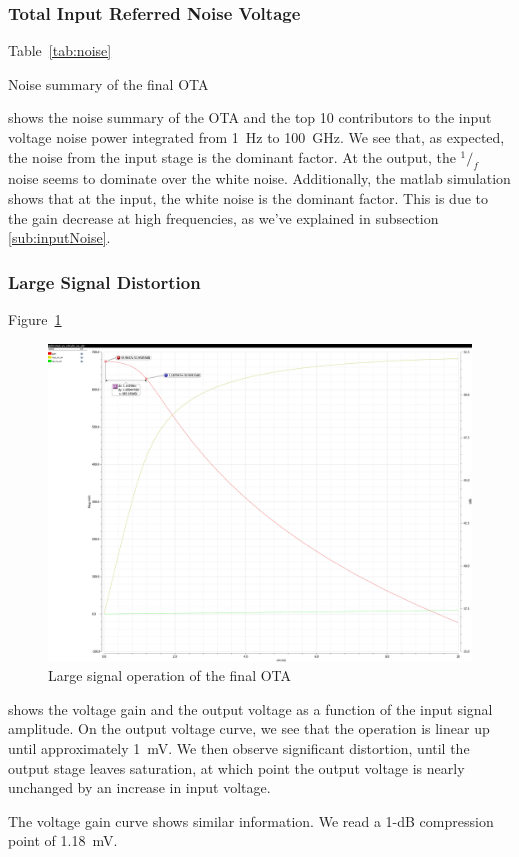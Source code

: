 \documentclass[english,10pt]{article}
\begin{document}
\subsubsection{Total Input Referred Noise Voltage}
Table~\ref{tab:noise}
\begin{table}[htbp]
  \centering
  \begin{minipage}{10cm}
  
  \caption{Noise summary of the final OTA\label{tab:noise}}
  \end{minipage}
\end{table}
shows the noise summary of the OTA and the top 10 contributors to the input voltage noise power integrated from \SI{1}{\hertz} to \SI{100}{\giga\hertz}. We see that, as expected, the noise from the input stage is the dominant factor. At the output, the $^1/_f$ noise seems to dominate over the white noise. Additionally, the matlab simulation shows that at the input, the white noise is the dominant factor. This is due to the gain decrease at high frequencies, as we've explained in subsection \ref{sub:inputNoise}.

\subsubsection{Large Signal Distortion}
Figure~\ref{fig:large}
\begin{figure}[htbp]
  \centering
  \includegraphics[width = \textwidth]{noise_3.pdf}
  \caption{Large signal operation of the final OTA\label{fig:large}}
\end{figure}
shows the voltage gain and the output voltage as a function of the input signal amplitude. On the output voltage curve, we see that the operation is linear up until approximately \SI{1}{\milli\volt}. We then observe significant distortion, until the output stage leaves saturation, at which point the output voltage is nearly unchanged by an increase in input voltage.

The voltage gain curve shows similar information. We read a 1-dB compression point of \SI{1.18}{\milli\volt}.
\end{document}
